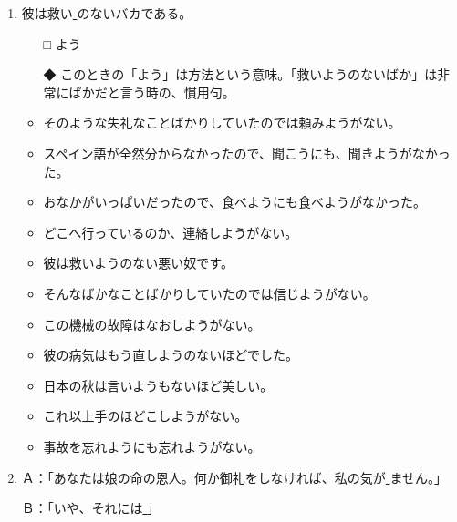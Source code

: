 \documentclass[
uplatex,
b5paper,
10pt,
dvipdfmx
]{jsbook}
\begin{document}
\begin{enumerate}
\item 彼は救い\underline{   }のないバカである。
\begin{itemize}
\item[□] よう
\item[◆] このときの「よう」は方法という意味。「救いようのないばか」は非
	  常にばかだと言う時の、慣用句。
\end{itemize}
\begin{itemize}
\item そのような失礼なことばかりしていたのでは頼みようがない。
\item スペイン語が全然分からなかったので、聞こうにも、聞きようがなかった。
\item おなかがいっぱいだったので、食べようにも食べようがなかった。
\item どこへ行っているのか、連絡しようがない。
\item 彼は救いようのない悪い奴です。
\item そんなばかなことばかりしていたのでは信じようがない。
\item この機械の故障はなおしようがない。
\item 彼の病気はもう直しようのないほどでした。
\item 日本の秋は言いようもないほど美しい。
\item これ以上手のほどこしようがない。
\item 事故を忘れようにも忘れようがない。
\end{itemize}


\item Ａ：「あなたは娘の命の恩人。何か御礼をしなければ、私の気が\underline{  
         }ません。」
 
      Ｂ：「いや、それには\underline{    }」


\end{enumerate}
\end{document}

